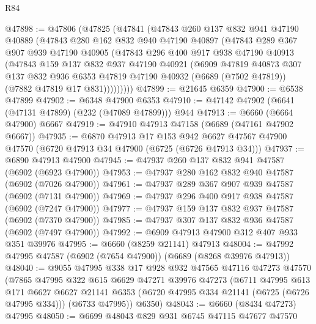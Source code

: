 \begin{lexlean}{R84}
\begin{coremodule}
@47898 := @47806
    (@47825
      (@47841
        (@47843
          @260
          @137
          @832
          @941
          @47190
          @40889
          (@47843
            @280
            @162
            @832
            @940
            @47190
            @40897
            (@47843
              @289
              @367
              @907
              @939
              @47190
              @40905
              (@47843
                @296
                @400
                @917
                @938
                @47190
                @40913
                (@47843
                  @159
                  @137
                  @832
                  @937
                  @47190
                  @40921
                  (@6909
                    @47819
                    @40873
                    @307
                    @137
                    @832
                    @936
                    @6353
                    @47819
                    @47190
                    @40932
                    (@6689 (@7502 @47819))
                    (@7882 @47819 @17 @831)))))))))
@47899 := @21645 @6359
@47900 := @6538 @47899
@47902 := @6348 @47900 @6353
@47910 := @47142 @47902 (@6641 (@47131 @47899) (@232 (@47089 @47899))) @944
@47913 := @6660 (@6664 @47900) @6667
@47919 := @47910 @47913 @47158 (@6689 (@47161 @47902 @6667))
@47935 := @6870
    @47913
    @17
    @153
    @942
    @6627
    @47567
    @47900
    @47570
    (@6720 @47913 @34 @47900 (@6725 (@6726 @47913 @34)))
@47937 := @6890 @47913 @47900
@47945 := @47937 @260 @137 @832 @941 @47587 (@6902 (@6923 @47900))
@47953 := @47937 @280 @162 @832 @940 @47587 (@6902 (@7026 @47900))
@47961 := @47937 @289 @367 @907 @939 @47587 (@6902 (@7131 @47900))
@47969 := @47937 @296 @400 @917 @938 @47587 (@6902 (@7247 @47900))
@47977 := @47937 @159 @137 @832 @937 @47587 (@6902 (@7370 @47900))
@47985 := @47937 @307 @137 @832 @936 @47587 (@6902 (@7497 @47900))
@47992 := @6909 @47913 @47900 @312 @407 @933 @351 @39976
@47995 := @6660 (@8259 @21141) @47913
@48004 := @47992 @47995 @47587 (@6902 (@7654 @47900)) (@6689 (@8268 @39976 @47913))
@48040 := @9055
    @47995
    @338
    @17
    @928
    @932
    @47565
    @47116
    @47273
    @47570
    (@7865
      @47995
      @322
      @615
      @6629
      @47271
      @39976
      @47273
      (@6711
        @47995
        @613
        @171
        @6627
        @6627
        @21141
        @6353
        (@6720 @47995 @334 @21141 (@6725 (@6726 @47995 @334)))
        (@6733 @47995))
      @6350)
@48043 := @6660 (@8434 @47273) @47995
@48050 := @6699 @48043 @829 @931 @6745 @47115 @47677 @47570

\end{coremodule}
\end{lexlean}
